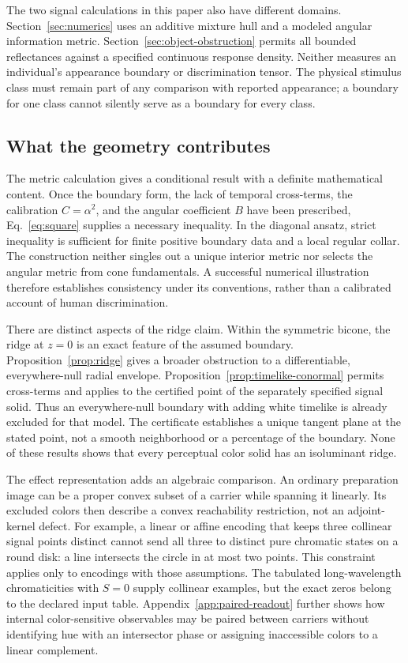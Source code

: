 \documentclass[11pt,letterpaper]{article}
\theoremstyle{plain}
\begin{document}
The two signal calculations in this paper also have different domains. Section~\ref{sec:numerics} uses an additive mixture hull and a modeled angular information metric. Section~\ref{sec:object-obstruction} permits all bounded reflectances against a specified continuous response density. Neither measures an individual's appearance boundary or discrimination tensor. The physical stimulus class must remain part of any comparison with reported appearance; a boundary for one class cannot silently serve as a boundary for every class.

\subsection{What the geometry contributes}
The metric calculation gives a conditional result with a definite mathematical content. Once the boundary form, the lack of temporal cross-terms, the calibration $C=\alpha^2$, and the angular coefficient $B$ have been prescribed, Eq.~\eqref{eq:square} supplies a necessary inequality. In the diagonal ansatz, strict inequality is sufficient for finite positive boundary data and a local regular collar. The construction neither singles out a unique interior metric nor selects the angular metric from cone fundamentals. A successful numerical illustration therefore establishes consistency under its conventions, rather than a calibrated account of human discrimination.

There are distinct aspects of the ridge claim. Within the symmetric bicone, the ridge at $z=0$ is an exact feature of the assumed boundary. Proposition~\ref{prop:ridge} gives a broader obstruction to a differentiable, everywhere-null radial envelope. Proposition~\ref{prop:timelike-conormal} permits cross-terms and applies to the certified point of the separately specified signal solid. Thus an everywhere-null boundary with adding white timelike is already excluded for that model. The certificate establishes a unique tangent plane at the stated point, not a smooth neighborhood or a percentage of the boundary. None of these results shows that every perceptual color solid has an isoluminant ridge.

The effect representation adds an algebraic comparison. An ordinary preparation image can be a proper convex subset of a carrier while spanning it linearly. Its excluded colors then describe a convex reachability restriction, not an adjoint-kernel defect. For example, a linear or affine encoding that keeps three collinear signal points distinct cannot send all three to distinct pure chromatic states on a round disk: a line intersects the circle in at most two points. This constraint applies only to encodings with those assumptions. The tabulated long-wavelength chromaticities with $S=0$ supply collinear examples, but the exact zeros belong to the declared input table. Appendix~\ref{app:paired-readout} further shows how internal color-sensitive observables may be paired between carriers without identifying hue with an intersector phase or assigning inaccessible colors to a linear complement.
\end{document}
